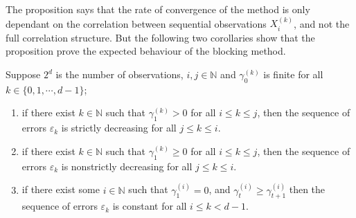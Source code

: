 \documentclass[11pt,english,a4paper]{article}
\begin{document}
The proposition says that the rate of convergence of the method is only dependant on the correlation between sequential observations $X_i^{(k)}$, and not the full correlation structure. But the following two corollaries show that the proposition prove the expected behaviour of the blocking method.
\begin{corollary}
Suppose $2^d$ is the number of observations, $i,j\in \mathbb{N}$ and $\gamma^{(k)}_0$ is finite for all $k \in \{ 0,1,\cdots, d-1 \}$;
\begin{enumerate}
\item if there exist $k \in \mathbb{N}$ such that $\gamma^{(k)}_1 > 0$ for all $i \leq k \leq j$, then the sequence of errors $\varepsilon_k$ is strictly decreasing for all $j \leq k \leq i$.
\item if there exist $k \in \mathbb{N}$ such that $\gamma^{(k)}_1 \geq 0$ for all $i \leq k \leq j$, then the sequence of errors $\varepsilon_k$ is nonstrictly decreasing for all $j \leq k \leq i$.
\item if there exist some $i \in \mathbb{N}$ such that $\gamma^{(i)}_1 = 0$, and $\gamma^{(i)}_t \geq \gamma^{(i)}_{t+1}$ then the sequence of errors $\varepsilon_k$ is constant for all $i \leq k < d-1$.
\end{enumerate}
\end{corollary}
\end{document}
